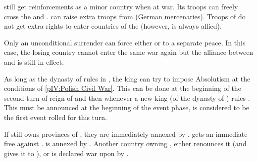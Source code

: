\phadm
\aparag \paysSaxe still get reinforcements as a minor country when at war. Its
troops can freely cross the \HRE and \POL. \POL can raise extra troops from
\paysSaxe (German mercenaries).
\aparag Troops of \POL do not get extra rights to enter countries of the \HRE
(however, \paysSaxe is always allied).
%

\phpaix
\aparag Only an unconditional surrender can force either \POL or \paysSaxe to
a separate peace.
\bparag In this case, the losing country cannot enter the same war again but
the alliance between \POL and \paysSaxe is still in effect.

\effetlong
\aparag As long as the dynasty of \paysSaxe rules in \POL, the king can try to
impose Absolutism at the conditions of \ref{pIV:Polish Civil War}.
\bparag This can be done at the beginning of the second turn of reign of
 and then whenever a new king (of the dynasty of
\paysSaxe) rules \POL.
\bparag This must be announced at the beginning of the event phase,
 is considered to be the first event rolled
for this turn.






\phevnt
\aparag If \POLpol still owns provinces of , they are
immediately annexed by \paysBrandebourg. \POL gets an immediate free \CB
against \paysBrandebourg.
\aparag \paysBerg is annexed by \paysBrandebourg.
\bparag Another country owning \paysBerg, either renounces it (and gives it to
\paysBrandebourg), or is declared war upon by \paysBrandebourg.

